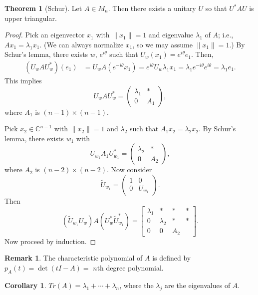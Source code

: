 \documentclass[12pt]{article}
\theoremstyle{definition}
\newtheorem*{theorem}{Theorem}
\newtheorem*{corollary}{Corollary}
\newtheorem*{remark}{Remark}
\newcommand{\norm}[1]{\|#1\|}
\newcommand{\C}{\mathbb{C}}
\begin{document}
\begin{theorem}[Schur]
Let $A \in M_n$. Then there exists a unitary $U$ so that $U^*AU$ is upper triangular.
\end{theorem}

\begin{proof}
Pick an eigenvector $x_1$ with $\norm{x_1} = 1$ and eigenvalue $\lambda_1$ of $A$; i.e., $Ax_1 = \lambda_1 x_1$. (We can always normalize $x_1$, so we may assume $\norm{x_1} = 1$.) By Schur's lemma, there exists $w$, $e^{i\theta}$ such that $U_w(x_1) = e^{i\theta} e_1$. Then,
\begin{align*}
(U_w A U_w^*)(e_1) &= U_w A(e^{-i\theta} x_1) = e^{i\theta} U_w \lambda_1 x_1 = \lambda_1 e^{-i\theta} e^{i\theta} = \lambda_1 e_1.
\end{align*}
This implies
\[
U_w A U_w^* = \begin{pmatrix} \lambda_1 & * \\ 0 & A_1 \end{pmatrix},
\]
where $A_1$ is $(n-1) \times (n-1)$.

Pick $x_2 \in \C^{n-1}$ with $\norm{x_2} = 1$ and $\lambda_2$ such that $A_1 x_2 = \lambda_2 x_2$. By Schur's lemma, there exists $w_1$ with
\[
U_{w_1} A_1 U_{w_1}^* = \begin{pmatrix} \lambda_2 & * \\ 0 & A_2 \end{pmatrix},
\]
where $A_2$ is $(n-2) \times (n-2)$. Now consider
\[
\tilde{U}_{w_1} = \begin{pmatrix} 1 & 0 \\ 0 & U_{w_1} \end{pmatrix}.
\]
Then
\[
(\tilde{U}_{w_1} U_w) A (U_w^* \tilde{U}_{w_1}^*) = \left[\begin{array}{cccc}
\lambda_1 & * & * & * \\
0 & \lambda_2 & * & * \\
0 & 0 & A_2 & {}
\end{array}\right].
\]
Now proceed by induction.
\end{proof}

\begin{remark}
The characteristic polynomial of $A$ is defined by $p_A(t) = \det(tI - A) =$ $n$th degree polynomial.
\end{remark}

\begin{corollary}
$Tr(A) = \lambda_1 + \cdots + \lambda_n$, where the $\lambda_j$ are the eigenvalues of $A$.
\end{corollary}
\end{document}
